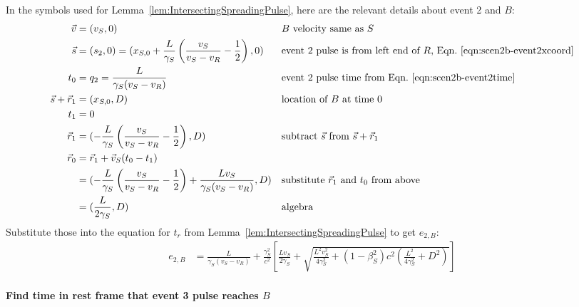 \documentclass[a4paper]{article}
\theoremstyle{plain}
\theoremstyle{definition}
\newcommand{\vect}[1]{\vec{#1}}
\begin{document}
In the symbols used for Lemma~\ref{lem:IntersectingSpreadingPulse},
here are the relevant details about event 2 and $B$:
\begin{align*}
\vect{v} & = (v_S, 0) & & \text{$B$ velocity same as $S$} \\
\vect{s} & = (s_2,0) = (x_{S,0} + \frac{L}{\gamma_S} \left( \frac{v_S}{v_S - v_R} - \frac{1}{2} \right), 0) & & \text{event 2 pulse is from left end of $R$, Eqn.~\eqref{eqn:scen2b-event2xcoord}} \\
t_0 & = q_2 = \frac{L}{\gamma_S(v_S - v_R)} & & \text{event 2 pulse time from Eqn.~\eqref{eqn:scen2b-event2time}} \\
\vect{s} + \vect{r}_1 & = (x_{S,0}, D) & & \text{location of $B$ at time 0} \\
t_1 & = 0 \\
\vect{r}_1 & = (-\frac{L}{\gamma_S} \left( \frac{v_S}{v_S - v_R} - \frac{1}{2} \right), D) & & \text{subtract $\vect{s}$ from $\vect{s}+\vect{r}_1$} \\
\vect{r}_0
  & = \vect{r}_1 + \vect{v}_S(t_0-t_1) \\
  & = (-\frac{L}{\gamma_S} \left( \frac{v_S}{v_S - v_R} - \frac{1}{2} \right) + \frac{Lv_S}{\gamma_S(v_S - v_R)}, D) & & \text{substitute $\vect{r}_1$ and $t_0$ from above} \\
  & = (\frac{L}{2\gamma_S}, D) & & \text{algebra}
\end{align*}
Substitute those into the equation for $t_r$ from
Lemma~\ref{lem:IntersectingSpreadingPulse} to get $e_{2,B}$:
\begin{align*}
e_{2,B} & = \frac{L}{\gamma_S(v_S - v_R)} + \frac{\gamma_S^2}{c^2} \left[ \frac{Lv_S}{2\gamma_S} + \sqrt{\frac{L^2v_S^2}{4\gamma_S^2} + (1-\beta_S^2)c^2 (\frac{L^2}{4\gamma_S^2} + D^2)} \right]
\end{align*}


\paragraph{Find time in rest frame that event 3 pulse reaches $B$}
\end{document}
